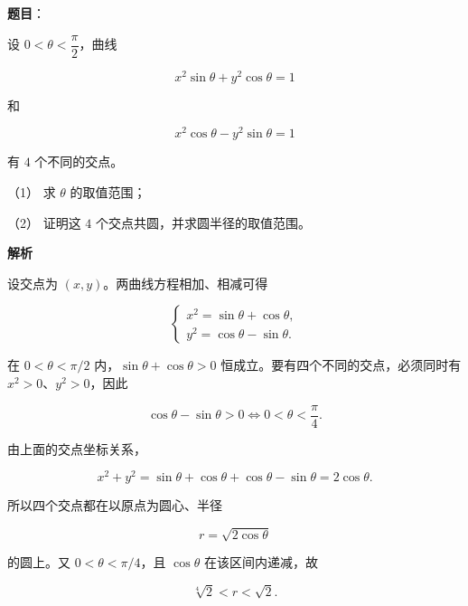 \begin{answer}

\textbf{题目}：

设 $0<\theta<\dfrac\pi2$，曲线

\nopagebreak[4]
\[
x^2\sin\theta+y^2\cos\theta=1
\]

和

\nopagebreak[4]
\[
x^2\cos\theta-y^2\sin\theta=1
\]

有 $4$ 个不同的交点。

（1） 求 $\theta$ 的取值范围；

（2） 证明这 $4$ 个交点共圆，并求圆半径的取值范围。

\textbf{解析}


设交点为 $(x,y)$。两曲线方程相加、相减可得

\nopagebreak[4]
\[
\begin{cases}
x^2=\sin\theta+\cos\theta,\\
y^2=\cos\theta-\sin\theta.
\end{cases}
\]

在 $0<\theta<\pi/2$ 内，$\sin\theta+\cos\theta>0$ 恒成立。要有四个不同的交点，必须同时有 $x^2>0$、$y^2>0$，因此

\nopagebreak[4]
\[
\cos\theta-\sin\theta>0
\Longleftrightarrow 0<\theta<\frac\pi4.
\]


由上面的交点坐标关系，

\nopagebreak[4]
\[
x^2+y^2
=\sin\theta+\cos\theta+\cos\theta-\sin\theta
=2\cos\theta.
\]

所以四个交点都在以原点为圆心、半径

\nopagebreak[4]
\[
r=\sqrt{2\cos\theta}
\]

的圆上。又 $0<\theta<\pi/4$，且 $\cos\theta$ 在该区间内递减，故

\nopagebreak[4]
\[
\sqrt[4]{2}<r<\sqrt2.
\]



\end{answer}